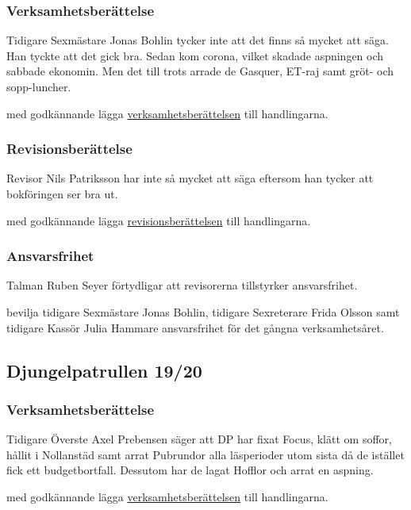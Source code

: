 \documentclass[hidelinks]{sektionsmote}
\begin{document}
\subsubsection{Verksamhetsberättelse}
Tidigare Sexmästare Jonas Bohlin tycker inte att det finns så mycket att säga.
Han tyckte att det gick bra.
Sedan kom corona, vilket skadade aspningen och sabbade ekonomin.
Men det till trots arrade de Gasquer, ET-raj samt gröt- och sopp-luncher.
\begin{beslut}
    \item med godkännande lägga \hyperlink{bilagor/f6/vb.pdf.1}{verksamhetsberättelsen} till handlingarna.
\end{beslut}

\subsubsection{Revisionsberättelse}
Revisor Nils Patriksson har inte så mycket att säga eftersom han tycker att bokföringen ser bra ut.
\begin{beslut}
    \item med godkännande lägga \hyperlink{bilagor/f6/rb.pdf.1}{revisionsberättelsen} till handlingarna.
\end{beslut}

\subsubsection{Ansvarsfrihet}
Talman Ruben Seyer förtydligar att revisorerna tillstyrker ansvarsfrihet.
\begin{beslut}
    \item bevilja tidigare Sexmästare Jonas Bohlin, tidigare Sexreterare Frida Olsson samt tidigare Kassör Julia Hammare ansvarsfrihet för det gångna verksamhetsåret.
\end{beslut}

\subsection{Djungelpatrullen 19/20}

\subsubsection{Verksamhetsberättelse}
Tidigare Överste Axel Prebensen säger att DP har fixat Focus, klätt om soffor, hållit i Nollanstäd samt arrat Pubrundor alla läsperioder utom sista då de istället fick ett budgetbortfall.
Dessutom har de lagat Hofflor och arrat en aspning.
\begin{beslut}
    \item med godkännande lägga \hyperlink{bilagor/dp/vb.pdf.1}{verksamhetsberättelsen} till handlingarna.
\end{beslut}
\end{document}
